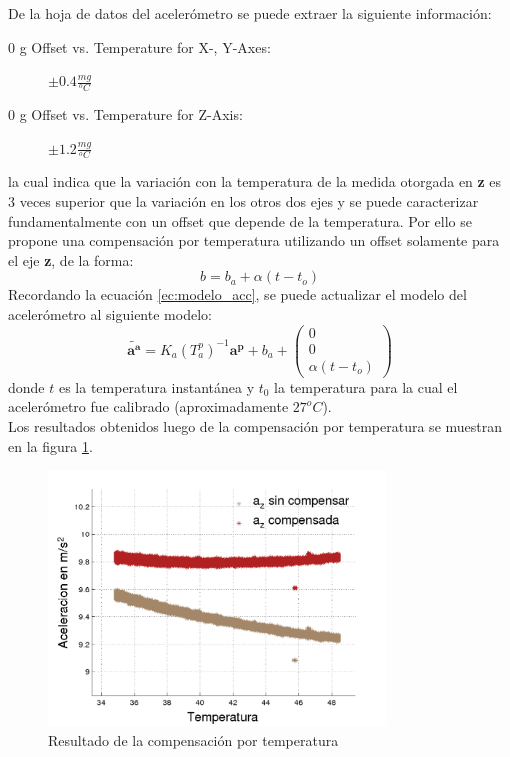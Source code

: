 \documentclass[main]{subfiles}
\begin{document}
De la hoja de datos del acelerómetro se puede extraer la siguiente información:
\begin{description}
\item [0 g Offset vs. Temperature for X-, Y-Axes:]$\pm 0.4\frac{mg}{^oC}$
\item [0 g Offset vs. Temperature for Z-Axis:]$\pm 1.2\frac{mg}{^oC}$
\end{description}
la cual indica que la variación con la temperatura de la medida otorgada en \textbf{z} es 3 veces superior que la variación en los otros dos ejes y se puede caracterizar fundamentalmente con un offset que depende de la temperatura. Por ello se propone una compensación por temperatura utilizando un offset solamente para el eje \textbf{z}, de la forma:
$$ b = b_a + \alpha (t - t_o) $$
Recordando la ecuación \ref{ec:modelo_acc}, se puede actualizar el modelo del acelerómetro al siguiente modelo:
\begin{equation}
\tilde{\mathbf{a^a}}=K_a(T_a^p)^{-1}\mathbf{a^p}+b_a+\left(
\begin{array}{c}
0 \\ 0 \\ \alpha(t - t_o)
\end{array}
\right)
\end{equation}
donde $t$ es la temperatura instantánea y $t_0$ la temperatura para la cual el acelerómetro fue calibrado (aproximadamente $27^oC$).\\

Los resultados obtenidos luego de la compensación por temperatura se muestran en la figura \ref{fig:resultado_temp}.

\begin{figure}[H]
  \begin{center}
    \includegraphics[width=0.8\textwidth]{./pics_acc/resultado_temp.pdf}
  \end{center}
  \vspace{-20pt}
  \caption{Resultado de la compensación por temperatura}
  \label{fig:resultado_temp}
\end{figure}
\end{document}
